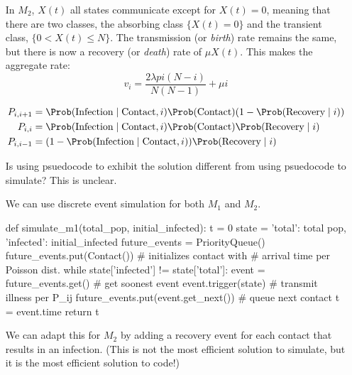 \begin{solution}
\begin{enumerate}
            In $M_2$, $X(t)$ all states communicate except for $X(t) =
            0$, meaning that there are two classes, the absorbing class
            $\{X(t) = 0\}$ and the transient class, $\{0 < X(t) \le
            N\}$. The transmission (or \emph{birth}) rate remains the
            same, but there is now a recovery (or \emph{death}) rate of
            $\mu X(t)$. This makes the aggregate rate:
            \[
                v_i = \frac{2\lambda p i(N-i)}{N(N-1)} + \mu i
            \]

            \begin{align*}
                P_{i,i+1} &= \Prob(\text{Infection} \mid \text{Contact},i)
                \Prob(\text{Contact})
                (1 - \Prob(\text{Recovery}\mid i))\\
                P_{i,i} &= \Prob(\text{Infection} \mid \text{Contact}, i)
                \Prob(\text{Contact})\Prob(\text{Recovery}\mid i)\\
                P_{i,i-1} &= (1- \Prob(\text{Infection} \mid
                \text{Contact},i))\Prob(\text{Recovery}\mid i)
            \end{align*}

        \item
            [Is using psuedocode to exhibit the solution different from
            using psuedocode to simulate? This is unclear.]

            We can use discrete event simulation for both $M_1$ and
            $M_2$.

            \begin{python}
def simulate_m1(total_pop, initial_infected):
    t = 0
    state = {'total': total pop, 'infected': initial_infected}
    future_events = PriorityQueue()
    future_events.put(Contact()) # initializes contact with 
                                 # arrival time per Poisson dist.
    while state['infected'] != state['total']:
        event = future_events.get() # get soonest event
        event.trigger(state)     # transmit illness per P_{ij}
        future_events.put(event.get_next()) # queue next contact
        t = event.time
    return t
\end{python}

            We can adapt this for $M_2$ by adding a recovery event for
            each contact that results in an infection. (This is not the
            most efficient solution to simulate, but it is the most
            efficient solution to code!)


\end{enumerate}
\end{solution}
